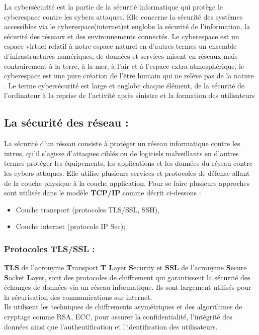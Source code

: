 La cybersécurité est la partie de la sécurité informatique qui protège le cyberespace contre les cybers attaques. Elle concerne la sécurité des systèmes accessibles via le cyberespace(internet)et englobe la sécurité de l’information, la sécurité des réseaux et des environnements connectés. Le cyberespace est un espace virtuel relatif à notre espace naturel en d’autres termes un ensemble d’infrastructures numériques, de données et services misent en réseaux mais contrairement à la terre, à la mer, à l’air et à l’espace-extra atmosphérique, le cyberespace est une pure création de l’être humain qui ne relève pas de la nature \cite{ref4}. Le terme cybersécurité est large et englobe chaque élément, de la sécurité de l’ordinateur à la reprise de l’activité après sinistre et la formation des utilisateurs \cite{ref8}
\subsection{La sécurité des réseau : }
La sécurité d’un réseau consiste à protéger un réseau informatique contre les intrus, qu'il s'agisse d'attaques ciblés ou de logiciels malveillants en d’autres termes protéger les équipements, les applications et les données du réseau contre les cybers attaques. Elle utilise plusieurs services et protocoles de défense allant de la couche physique à la couche application. Pour se faire plusieurs approches sont utilisés dans le modèle \textbf{TCP/IP} comme décrit ci-dessous :
\begin{itemize}[label=\textbullet]
\item Couche transport (protocoles TLS/SSL, SSH),
\item Couche internet (protocole IP Sec);
\end{itemize}
\subsubsection{Protocoles TLS/SSL :}
\textbf{TLS} de l’acronyme \textbf{T}ransport \textbf{T
L}ayer \textbf{S}ecurity et \textbf{SSL} de l’acronyme \textbf{S}ecure \textbf{S}ocket \textbf{L}ayer, sont des protocoles de chiffrement qui garantissent la sécurité des échanges de données via un réseau informatique. Ils sont largement utilisés pour la sécurisation des communications sur internet.\\
Ils utilisent les techniques de chiffrements asymétriques et des algorithmes de cryptage comme RSA, ECC, pour assurer la confidentialité, l’intégrité des données ainsi que l’authentification et l’identification des utilisateurs.
